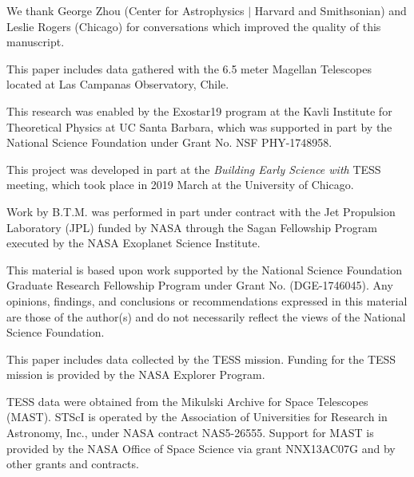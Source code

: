 \documentclass[twocolumn]{aastex63}
\begin{document}
\acknowledgements

We thank George Zhou (Center for Astrophysics $|$ Harvard and Smithsonian) and Leslie Rogers (Chicago) for conversations which improved the quality of this manuscript.

This paper includes data gathered with the 6.5 meter Magellan Telescopes located at Las Campanas Observatory, Chile.


This research was enabled by the Exostar19 program at the Kavli Institute for Theoretical Physics at UC Santa Barbara, which was supported in part by the National Science Foundation under Grant No. NSF PHY-1748958.

This project was developed in part at the \textit{Building Early Science with} TESS meeting, which took place in 2019 March at the University of Chicago.

Work by B.T.M. was performed in part under contract with the Jet
Propulsion Laboratory (JPL) funded by NASA through
the Sagan Fellowship Program executed by the NASA
Exoplanet Science Institute.

This material is based upon work supported by the National Science Foundation Graduate Research Fellowship Program under Grant No. (DGE-1746045). Any opinions, findings, and conclusions or recommendations expressed in this material are those of the author(s) and do not necessarily reflect the views of the National Science Foundation.



This paper includes data collected by the TESS mission. Funding for the TESS mission is provided by the NASA Explorer Program.

TESS data were obtained from the Mikulski Archive for Space Telescopes
(MAST).
STScI is operated by the Association of Universities for Research in
Astronomy, Inc., under NASA contract NAS5-26555.
Support for MAST is provided by the NASA Office of Space Science via grant
NNX13AC07G and by other grants and contracts.














\end{document}
